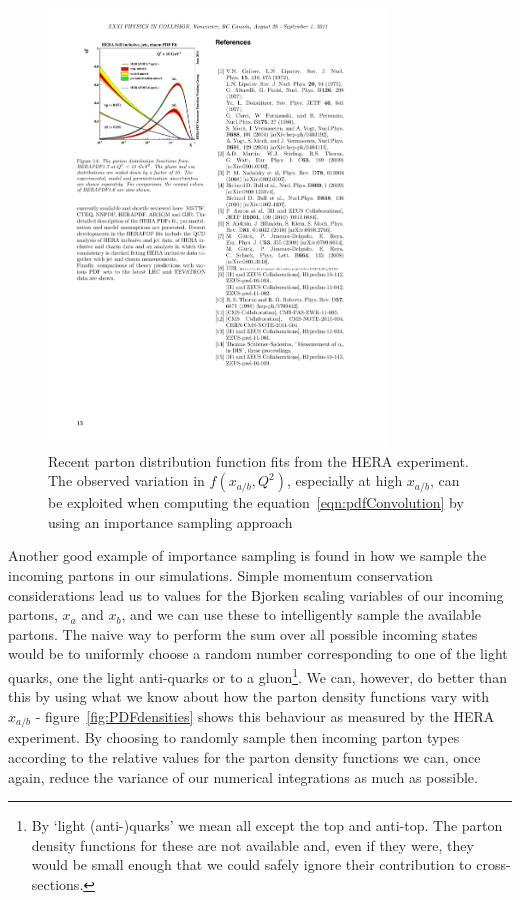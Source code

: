 	\begin{figure}[htp]
		\centering
		\includegraphics[width=0.8\textwidth, height=0.6\textwidth]{HERAFit}
		\caption{Recent parton distribution function fits from the HERA experiment.  The observed variation in $f(x_{a/b}, Q^2)$, especially at high
		         $x_{a/b}$, can be exploited when computing the equation~\ref{eqn:pdfConvolution} by using an importance sampling approach}
		\label{fig:heraFit}
  	\end{figure}

  	Another good example of importance sampling is found in how we sample the incoming partons in our simulations.  Simple momentum
  	conservation considerations lead us to values for the Bjorken scaling variables of our incoming partons, $x_a$ and $x_b$, and we
  	can use these to intelligently sample the available partons.  The naive way to perform the sum over all possible incoming states
  	would be to uniformly choose a random number corresponding to one of the light quarks, one the light anti-quarks or to a
  	gluon\footnote{By `light (anti-)quarks' we mean all except the top and anti-top.  The parton density functions for these are not available
  	and, even if they were, they would be small enough that we could safely ignore their contribution to cross-sections.}.  We can,
  	however, do better than this by using what we know about how the parton density functions vary with $x_{a/b}$ - figure~\ref{fig:PDFdensities}
  	shows this behaviour as measured by the HERA experiment.  By choosing to randomly sample then incoming parton types according to the relative values
  	for the parton density functions we can, once again, reduce the variance of our numerical integrations as much as possible.

